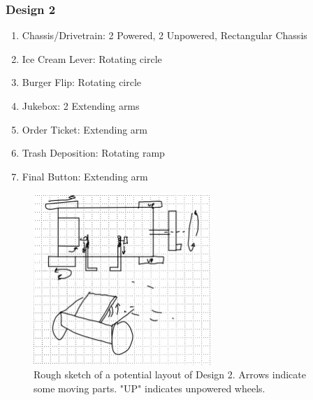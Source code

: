 \documentclass[12pt]{extarticle}
\begin{document}
\subsubsection*{Design 2}
\begin{enumerate}
    \item Chassis/Drivetrain: 2 Powered, 2 Unpowered, Rectangular Chassis
    \item Ice Cream Lever: Rotating circle
    \item Burger Flip: Rotating circle
    \item Jukebox: 2 Extending arms
    \item Order Ticket: Extending arm
    \item Trash Deposition: Rotating ramp
    \item Final Button: Extending arm
\end{enumerate}
\begin{figure}[H]
    \centering
    \includegraphics[width=0.6\textwidth]{Unpowered.png}
    \caption{\centering Rough sketch of a potential layout of Design 2. Arrows indicate some moving parts. "UP" indicates unpowered wheels.}
    \label{fig:unpowered}
\end{figure}
\end{document}
